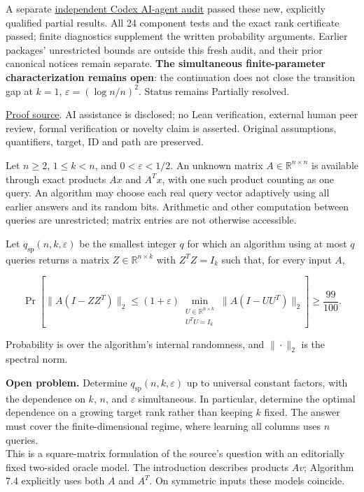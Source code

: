 \documentclass[11pt,a4paper]{article}
\makeatletter
\renewcommand{\subsection}{\Needspace{4\baselineskip}\@startsection{subsection}{2}{0pt}{9pt plus 1pt minus 1pt}{3pt}{\sffamily\bfseries\normalsize\color{ink}}}
\makeatother
\begin{document}
A separate
\href{https://github.com/ajt60gaibb/OpenProblemsInNLA/blob/main/reviews/2026-09-14-further-submissions/RA-14-review.md}{independent
Codex AI-agent audit} passed these new, explicitly qualified partial
results. All 24 component tests and the exact rank certificate passed;
finite diagnostics supplement the written probability arguments. Earlier
packages' unrestricted bounds are outside this fresh audit, and their
prior canonical notices remain separate. \textbf{The simultaneous
finite-parameter characterization remains open}: the continuation does
not close the transition gap at \(k=1\), \(\varepsilon=(\log n/n)^2\).
Status remains Partially resolved.

\href{https://github.com/ajt60gaibb/OpenProblemsInNLA/blob/main/references/holden-further-2026-09-14/RA-14/manuscript.tex}{Proof
source}. AI assistance is disclosed; no Lean verification, external
human peer review, formal verification or novelty claim is asserted.
Original assumptions, quantifiers, target, ID and path are preserved.

\subsection{Problem statement}\label{problem-statement}

Let \(n\ge2\), \(1\le k< n\), and \(0<\varepsilon<1/2\). An unknown
matrix \(A\in\mathbb R^{n\times n}\) is available through exact products
\(Ax\) and \(A^Tx\), with one such product counting as one query. An
algorithm may choose each real query vector adaptively using all earlier
answers and its random bits. Arithmetic and other computation between
queries are unrestricted; matrix entries are not otherwise accessible.

Let \(q_{\mathrm{sp}}(n,k,\varepsilon)\) be the smallest integer \(q\)
for which an algorithm using at most \(q\) queries returns a matrix
\(Z\in\mathbb R^{n\times k}\) with \(Z^TZ=I_k\) such that, for every
input \(A\),

\[\Pr\!\left[
\|A(I-ZZ^T)\|_2
\le (1+\varepsilon)
\min_{\substack{U\in\mathbb R^{n\times k}\\U^TU=I_k}}
\|A(I-UU^T)\|_2
\right]\ge\frac{99}{100}.\]

Probability is over the algorithm's internal randomness, and
\(\|\cdot\|_2\) is the spectral norm.

\textbf{Open problem.} Determine \(q_{\mathrm{sp}}(n,k,\varepsilon)\) up
to universal constant factors, with the dependence on \(k\), \(n\), and
\(\varepsilon\) simultaneous. In particular, determine the optimal
dependence on a growing target rank rather than keeping \(k\) fixed. The
answer must cover the finite-dimensional regime, where learning all
columns uses \(n\) queries.\\
This is a square-matrix formulation of the source's question with an
editorially fixed two-sided oracle model. The introduction describes
products \(Av\); Algorithm 7.4 explicitly uses both \(A\) and \(A^T\).
On symmetric inputs these models coincide.
\end{document}
